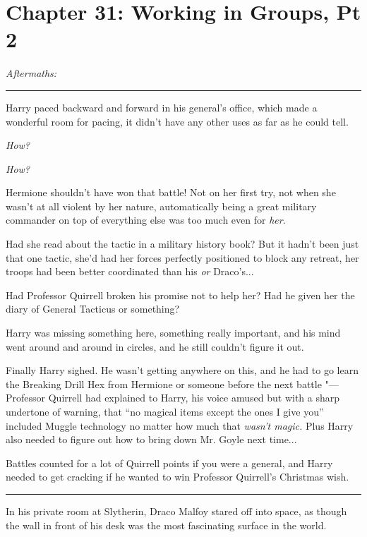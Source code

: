 \chapter{Chapter 31: Working in Groups, Pt 2}
\emph{Aftermaths:}

\begin{center}\rule{3in}{0.4pt}\end{center}

Harry paced backward and forward in his general's office, which made a
wonderful room for pacing, it didn't have any other uses as far as he
could tell.

\emph{How?}

\emph{How?}

Hermione shouldn't have won that battle! Not on her first try, not when
she wasn't at all violent by her nature, automatically being a great
military commander on top of everything else was too much even for
\emph{her}.

Had she read about the tactic in a military history book? But it hadn't
been just that one tactic, she'd had her forces perfectly positioned to
block any retreat, her troops had been better coordinated than his
\emph{or} Draco's...

Had Professor Quirrell broken his promise not to help her? Had he given
her the diary of General Tacticus or something?

Harry was missing something here, something really important, and his
mind went around and around in circles, and he still couldn't figure it
out.

Finally Harry sighed. He wasn't getting anywhere on this, and he had to
go learn the Breaking Drill Hex from Hermione or someone before the next
battle "--- Professor Quirrell had explained to Harry, his voice amused but
with a sharp undertone of warning, that ``no magical items except the
ones I give you'' included Muggle technology no matter how much that
\emph{wasn't magic.} Plus Harry also needed to figure out how to bring
down Mr. Goyle next time...

Battles counted for a lot of Quirrell points if you were a general, and
Harry needed to get cracking if he wanted to win Professor Quirrell's
Christmas wish.

\begin{center}\rule{3in}{0.4pt}\end{center}

In his private room at Slytherin, Draco Malfoy stared off into space, as
though the wall in front of his desk was the most fascinating surface in
the world.


